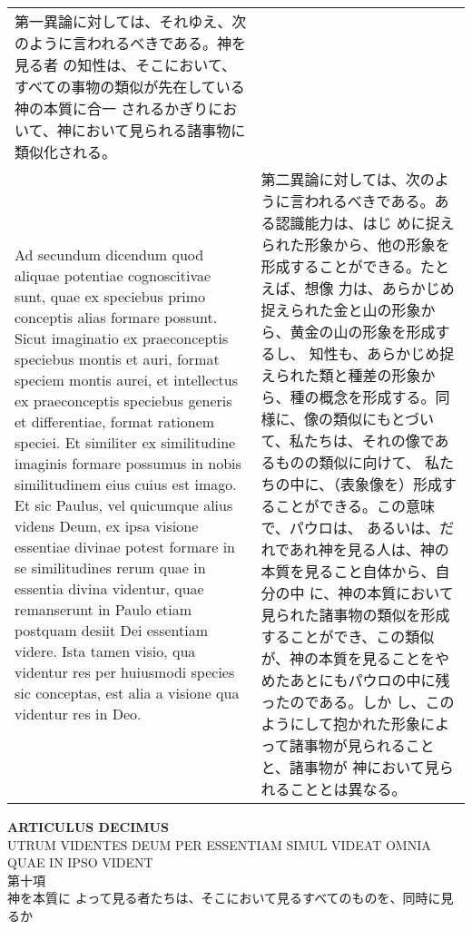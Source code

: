 \documentclass[10pt]{jsarticle} %
\begin{document}
\begin{longtable}{p{21em}p{21em}}
第一異論に対しては、それゆえ、次のように言われるべきである。神を見る者
の知性は、そこにおいて、すべての事物の類似が先在している神の本質に合一
されるかぎりにおいて、神において見られる諸事物に類似化される。

\\

{\sc Ad secundum dicendum} quod aliquae potentiae cognoscitivae sunt,
quae ex speciebus primo conceptis alias formare possunt. Sicut
imaginatio ex praeconceptis speciebus montis et auri, format speciem
montis aurei, et intellectus ex praeconceptis speciebus generis et
differentiae, format rationem speciei. Et similiter ex similitudine
imaginis formare possumus in nobis similitudinem eius cuius est
imago. Et sic Paulus, vel quicumque alius videns Deum, ex ipsa visione
essentiae divinae potest formare in se similitudines rerum quae in
essentia divina videntur, quae remanserunt in Paulo etiam postquam
desiit Dei essentiam videre. Ista tamen visio, qua videntur res per
huiusmodi species sic conceptas, est alia a visione qua videntur res
in Deo.


&

第二異論に対しては、次のように言われるべきである。ある認識能力は、はじ
めに捉えられた形象から、他の形象を形成することができる。たとえば、想像
力は、あらかじめ捉えられた金と山の形象から、黄金の山の形象を形成するし、
知性も、あらかじめ捉えられた類と種差の形象から、種の概念を形成する。同
様に、像の類似にもとづいて、私たちは、それの像であるものの類似に向けて、
私たちの中に、（表象像を）形成することができる。この意味で、パウロは、
あるいは、だれであれ神を見る人は、神の本質を見ること自体から、自分の中
に、神の本質において見られた諸事物の類似を形成することができ、この類似
が、神の本質を見ることをやめたあとにもパウロの中に残ったのである。しか
し、このようにして抱かれた形象によって諸事物が見られることと、諸事物が
神において見られることとは異なる。

\end{longtable}


\newpage


\begin{center}
{\Large {\bf ARTICULUS DECIMUS}}\\ {\large UTRUM VIDENTES DEUM PER
ESSENTIAM SIMUL VIDEAT OMNIA\\QUAE IN IPSO VIDENT\\第十項\\神を本質に
よって見る者たちは、そこにおいて見るすべてのものを、同時に見るか}
\end{center}
\end{document}
